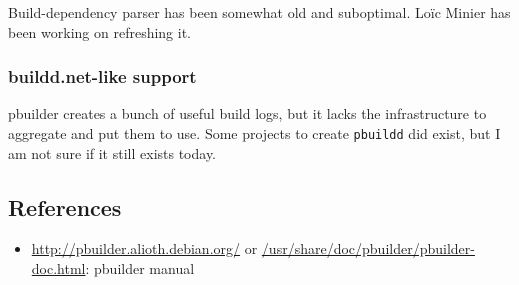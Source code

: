 \documentclass[a4paper]{article}
\begin{document}
Build-dependency parser has been somewhat old and suboptimal.  Lo\"ic
Minier has been working on refreshing it.

\subsubsection{buildd.net-like support}

pbuilder creates a bunch of useful build logs, but it lacks the
infrastructure to aggregate and put them to use.  Some projects to
create \texttt{pbuildd} did exist, but I am not sure if it still exists
today.

\subsection{References}

\begin{itemize}
 \item \url{http://pbuilder.alioth.debian.org/} or
 \url{/usr/share/doc/pbuilder/pbuilder-doc.html}: pbuilder manual
\end{itemize}
\end{document}

